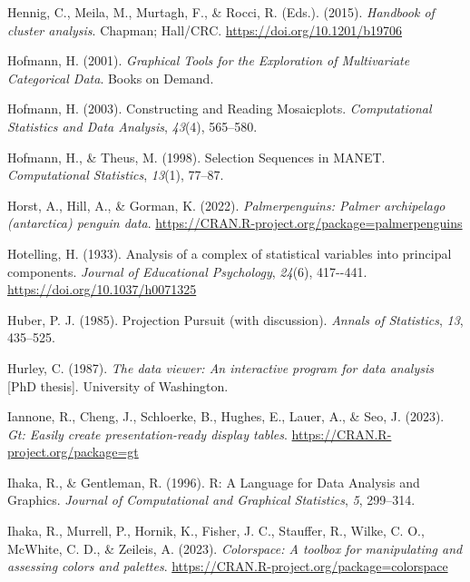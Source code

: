 \documentclass[
  letterpaper,
]{book}
\newlength{\cslhangindent}
\newlength{\cslentryspacingunit} %
\newenvironment{CSLReferences}[2] %
 {%
  \setlength{\parindent}{0pt}
  \ifodd #1
  \let\oldpar\par
  \def\par{\hangindent=\cslhangindent\oldpar}
  \fi
  \setlength{\parskip}{#2\cslentryspacingunit}
 }%
 {}
\begin{document}
\begin{CSLReferences}{1}{0}
\leavevmode{}%
Hennig, C., Meila, M., Murtagh, F., \& Rocci, R. (Eds.). (2015).
\emph{Handbook of cluster analysis}. Chapman; Hall/{CRC}.
\url{https://doi.org/10.1201/b19706}

\leavevmode{}%
Hofmann, H. (2001). \emph{Graphical {T}ools for the {E}xploration of
{M}ultivariate {C}ategorical {D}ata}. Books on Demand.

\leavevmode{}%
Hofmann, H. (2003). Constructing and {R}eading {M}osaicplots.
\emph{Computational Statistics and Data Analysis}, \emph{43}(4),
565--580.

\leavevmode{}%
Hofmann, H., \& Theus, M. (1998). Selection {S}equences in {MANET}.
\emph{Computational Statistics}, \emph{13}(1), 77--87.

\leavevmode{}%
Horst, A., Hill, A., \& Gorman, K. (2022). \emph{Palmerpenguins: Palmer
archipelago (antarctica) penguin data}.
\url{https://CRAN.R-project.org/package=palmerpenguins}

\leavevmode{}%
Hotelling, H. (1933). Analysis of a complex of statistical variables
into principal components. \emph{Journal of Educational Psychology},
\emph{24}(6), 417-\/-441. \url{https://doi.org/10.1037/h0071325}

\leavevmode{}%
Huber, P. J. (1985). {P}rojection {P}ursuit (with discussion).
\emph{Annals of Statistics}, \emph{13}, 435--525.

\leavevmode{}%
Hurley, C. (1987). \emph{The data viewer: An interactive program for
data analysis} {[}PhD thesis{]}. University of Washington.

\leavevmode{}%
Iannone, R., Cheng, J., Schloerke, B., Hughes, E., Lauer, A., \& Seo, J.
(2023). \emph{Gt: Easily create presentation-ready display tables}.
\url{https://CRAN.R-project.org/package=gt}

\leavevmode{}%
Ihaka, R., \& Gentleman, R. (1996). R: {A} {L}anguage for {D}ata
{A}nalysis and {G}raphics. \emph{Journal of Computational and Graphical
Statistics}, \emph{5}, 299--314.

\leavevmode{}%
Ihaka, R., Murrell, P., Hornik, K., Fisher, J. C., Stauffer, R., Wilke,
C. O., McWhite, C. D., \& Zeileis, A. (2023). \emph{Colorspace: A
toolbox for manipulating and assessing colors and palettes}.
\url{https://CRAN.R-project.org/package=colorspace}


\end{CSLReferences}
\end{document}
